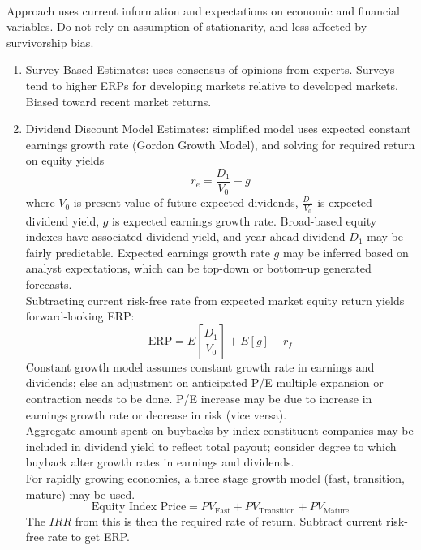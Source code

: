 \begin{method} \\
Approach uses current information and expectations on economic and financial variables. Do not rely on assumption of stationarity, and less affected by survivorship bias.
\begin{enumerate}[label=\roman*.]
\setlength{\itemsep}{0pt}
\item Survey-Based Estimates: uses consensus of opinions from experts. Surveys tend to higher ERPs for developing markets relative to developed markets. Biased toward recent market returns.
\item Dividend Discount Model Estimates: simplified model uses expected constant earnings growth rate (Gordon Growth Model), and solving for required return on equity yields
\begin{equation}
r_e = \frac{D_1}{V_0} + g \nonumber
\end{equation}
where $V_0$ is present value of future expected dividends, $\frac{D_1}{V_0}$ is expected dividend yield, $g$ is expected earnings growth rate. Broad-based equity indexes have associated dividend yield, and year-ahead dividend $D_1$ may be fairly predictable. Expected earnings growth rate $g$ may be inferred based on analyst expectations, which can be top-down or bottom-up generated forecasts.\\
Subtracting current risk-free rate from expected market equity return yields forward-looking ERP:
\begin{equation}
\text{ERP} = E\left[\frac{D_1}{V_0}\right] + E[g] - r_f \nonumber 
\end{equation}
Constant growth model assumes constant growth rate in earnings and dividends; else an adjustment on anticipated P/E multiple expansion or contraction needs to be done. P/E increase may be due to increase in earnings growth rate or decrease in risk (vice versa). \\
Aggregate amount spent on buybacks by index constituent companies may be included in dividend yield to reflect total payout; consider degree to which buyback alter growth rates in earnings and dividends.\\
For rapidly growing economies, a three stage growth model (fast, transition, mature) may be used. 
\begin{equation}
\text{Equity Index Price} = PV_{\text{Fast}} + PV_{\text{Transition}} + PV_{\text{Mature}} \nonumber
\end{equation}
The $IRR$ from this is then the required rate of return. Subtract current risk-free rate to get ERP.

\end{enumerate}
\end{method}
